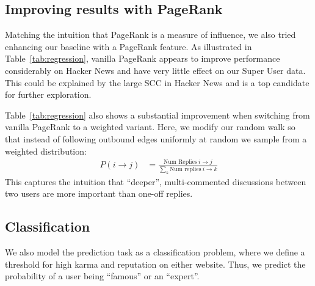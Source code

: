 \documentclass[10pt]{article}
\begin{document}
\subsection{Improving results with PageRank}
\label{sec:baseline-and-pagerank}
Matching the intuition that PageRank is a measure of influence, we also tried
enhancing our baseline with a PageRank feature. As illustrated in Table~\ref{tab:regression},
vanilla PageRank appears to improve performance considerably on Hacker News and have
very little effect on our Super User data. This could be explained by the large SCC
in Hacker News and is a top candidate for further exploration.

Table~\ref{tab:regression} also shows a substantial improvement
when switching from vanilla PageRank to a weighted variant. Here, we modify
our random walk so that instead of following outbound edges uniformly at random
we sample from a weighted distribution:
\begin{align}
P(i\rightarrow j)  &= \frac{\text{Num Replies}\ i \rightarrow j}{\sum_k \text{Num
replies}\ i \rightarrow k}
\end{align}
This captures the intuition that ``deeper'', multi-commented discussions
between two users are more important than one-off replies.


\subsection{Classification}
We also model the prediction task as a classification problem, where we define a
threshold for high karma and reputation on either website. Thus, we predict the
probability of a user being ``famous'' or an ``expert''.
\end{document}
